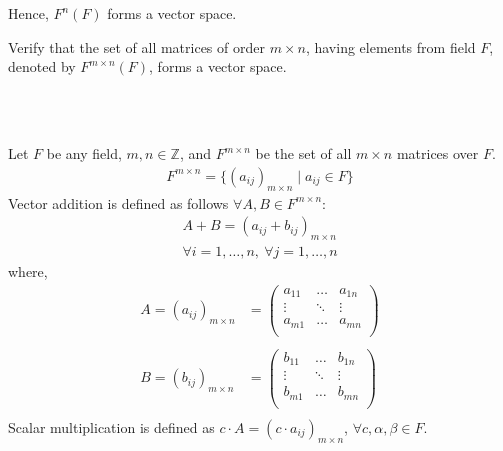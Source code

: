 \documentclass[12pt]{ipu-math}
\begin{document}
    \\~

    Hence, $F^n(F)$ forms a vector space.

    \newpage
    \pagestyle{fancy}

    \example
    Verify that the set of all matrices of order $m\times{n}$, having elements from field $F$, denoted by
    $F^{m\times{n}}(F)$, forms a vector space.

    \\~

    \solution
    Let $F$ be any field, $m, n \in \mathbb{Z}$, and $F^{m\times{n}}$ be the set of all $m\times{n}$ matrices over $F$.
    \begin{align*}
        F^{m\times{n}} = \{(a_{ij})_{m\times{n}} \mid a_{ij} \in F\}
    \end{align*}
    Vector addition is defined as follows $\forall A, B \in F^{m\times{n}}$:
    \begin{gather*}
        A + B = (a_{ij} + b_{ij})_{m\times{n}}\\
        \forall i = 1, \ldots, n,~\forall j = 1, \ldots, n
    \end{gather*}where,%
    \begin{align*}
        A = (a_{ij})_{m\times{n}} &=
        \begin{pmatrix}
            a_{11} & \ldots & a_{1n} \\
            \vdots & \ddots & \vdots \\
            a_{m1} & \ldots & a_{mn} \\
        \end{pmatrix}\\~\\
        B = (b_{ij})_{m\times{n}} &=
        \begin{pmatrix}
            b_{11} & \ldots & b_{1n} \\
            \vdots & \ddots & \vdots \\
            b_{m1} & \ldots & b_{mn} \\
        \end{pmatrix}\\
    \end{align*}%
    Scalar multiplication is defined as $c\cdot{A} = (c\cdot a_{ij})_{m\times{n}}$, $\forall c,\alpha,\beta \in F$.
\end{document}
